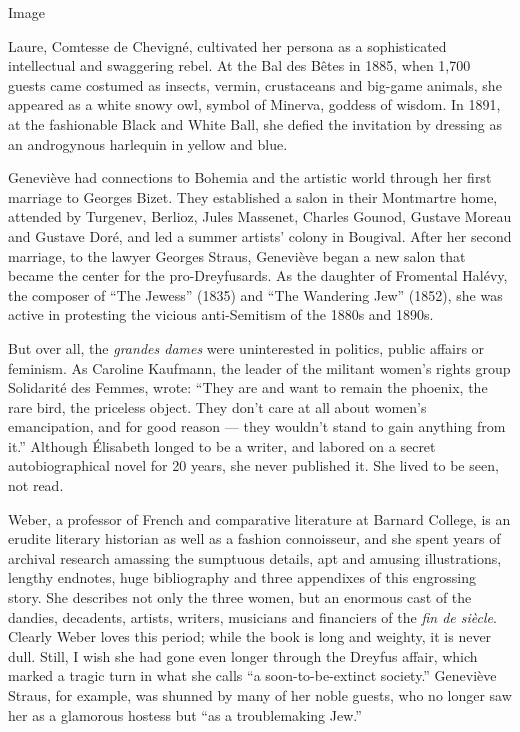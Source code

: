 Image

Laure, Comtesse de Chevigné, cultivated her persona as a sophisticated
intellectual and swaggering rebel. At the Bal des Bêtes in 1885, when
1,700 guests came costumed as insects, vermin, crustaceans and big-game
animals, she appeared as a white snowy owl, symbol of Minerva, goddess
of wisdom. In 1891, at the fashionable Black and White Ball, she defied
the invitation by dressing as an androgynous harlequin in yellow and
blue.

Geneviève had connections to Bohemia and the artistic world through her
first marriage to Georges Bizet. They established a salon in their
Montmartre home, attended by Turgenev, Berlioz, Jules Massenet, Charles
Gounod, Gustave Moreau and Gustave Doré, and led a summer artists'
colony in Bougival. After her second marriage, to the lawyer Georges
Straus, Geneviève began a new salon that became the center for the
pro-Dreyfusards. As the daughter of Fromental Halévy, the composer of
``The Jewess'' (1835) and ``The Wandering Jew'' (1852), she was active
in protesting the vicious anti-Semitism of the 1880s and 1890s.

But over all, the \emph{grandes dames} were uninterested in politics,
public affairs or feminism. As Caroline Kaufmann, the leader of the
militant women's rights group Solidarité des Femmes, wrote: ``They are
and want to remain the phoenix, the rare bird, the priceless object.
They don't care at all about women's emancipation, and for good reason
--- they wouldn't stand to gain anything from it.'' Although Élisabeth
longed to be a writer, and labored on a secret autobiographical novel
for 20 years, she never published it. She lived to be seen, not read.

Weber, a professor of French and comparative literature at Barnard
College, is an erudite literary historian as well as a fashion
connoisseur, and she spent years of archival research amassing the
sumptuous details, apt and amusing illustrations, lengthy endnotes, huge
bibliography and three appendixes of this engrossing story. She
describes not only the three women, but an enormous cast of the dandies,
decadents, artists, writers, musicians and financiers of the \emph{fin
de siècle}. Clearly Weber loves this period; while the book is long and
weighty, it is never dull. Still, I wish she had gone even longer
through the Dreyfus affair, which marked a tragic turn in what she calls
``a soon-to-be-extinct society.'' Geneviève Straus, for example, was
shunned by many of her noble guests, who no longer saw her as a
glamorous hostess but ``as a troublemaking Jew.''

